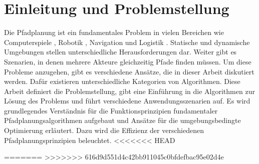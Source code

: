 \chapter{Einleitung und Problemstellung}

Die Pfadplanung ist ein fundamentales Problem in vielen Bereichen wie Computerspiele \cite{Krishnaswamy.2009}, Robotik \cite{latombe}, Navigation und Logistik \cite{Botea.2011}. Statische und dynamische Umgebungen stellen unterschiedliche Herausforderungen dar. Weiter gibt es Szenarien, in denen mehrere Akteure gleichzeitig Pfade finden müssen. Um diese Probleme anzugehen, gibt es verschiedene Ansätze, die in dieser Arbeit diskutiert werden. Dafür existieren unterschiedliche Kategorien von Algorithmen. Diese Arbeit definiert die Problemstellung, gibt eine Einführung in die Algorithmen zur Lösung des Problems und führt verschiedene Anwendungsszenarien auf. Es wird grundlegendes Verständnis für die Funktionsprinzipien fundamentaler Pfadplanungsalgorithmen aufgebaut und Ansätze für die umgebungsbedingte Optimierung erläutert. Dazu wird die Effizienz der verschiedenen Pfadplanungsprinzipien beleuchtet.
<<<<<<< HEAD

=======
>>>>>>> 616d9d551d4c42bb911045c0bfdefbac95e02d4e
